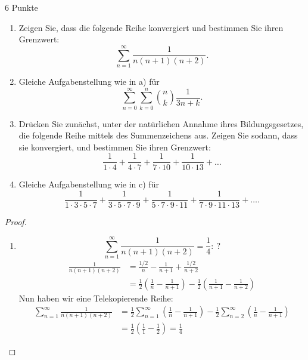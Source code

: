 \documentclass{../problemset}
\author{Michael van Straten}
\begin{document}
\maketitle

\begin{problem}{6 Punkte}
\begin{enumerate}
	\item Zeigen Sie, dass die folgende Reihe konvergiert und bestimmen Sie ihren Grenzwert:
	      \[
		      \sum_{n=1}^{\infty} \frac{1}{n(n + 1)(n + 2)}.
	      \]
	\item Gleiche Aufgabenstellung wie in a) für
	      \[
		      \sum_{n=0}^{\infty} \sum_{k=0}^{n} {n \choose k} \frac{1}{3n+k}.
	      \]
	\item Drücken Sie zunächst, unter der natürlichen Annahme ihres Bildungsgesetzes, die folgende Reihe mittels des Summenzeichens aus. Zeigen Sie sodann, dass sie konvergiert, und bestimmen Sie ihren Grenzwert:
	      \[
		      \frac{1}{1 \cdot 4 } + \frac{1}{4 \cdot 7 } + \frac{1}{7 \cdot 10} + \frac{1}{10 \cdot 13} + \ldots
	      \]
	\item Gleiche Aufgabenstellung wie in c) für
	      \[
		      \frac{1}{1 \cdot 3 \cdot 5 \cdot 7 } + \frac{1}{3 \cdot 5 \cdot 7 \cdot 9} + \frac{1}{5 \cdot 7 \cdot 9 \cdot 11} + \frac{1}{7 \cdot 9 \cdot 11 \cdot 13} + \ldots.
	      \]
\end{enumerate}
\begin{proof}
	\begin{enumerate}
		\item
		      \[
			      \sum_{n = 1}^{\infty}\frac{1}{n(n + 1)(n + 2)} = \frac{1}{4}:\ ?
		      \]
		      \begin{align}
			      \frac{1}{n(n + 1)(n + 2)} & = \frac{1/2}{n} - \frac{1}{n + 1} + \frac{1/2}{n + 2}                                                               \\
			                                & = \frac{1}{2}\left(\frac{1}{n} - \frac{1}{n + 1}\right) - \frac{1}{2}\left(\frac{1}{n + 1} - \frac{1}{n + 2}\right)
		      \end{align}
		      Nun haben wir eine Telekopierende Reihe:
		      \begin{align}
			      \sum_{n = 1}^{\infty}\frac{1}{n(n + 1)(n + 2)} & = \frac{1}{2}\sum_{n = 1}^{\infty}\left(\frac{1}{n} - \frac{1}{n + 1}\right) - \frac{1}{2}\sum_{n = 2}^{\infty}\left(\frac{1}{n} - \frac{1}{n + 1}\right) \\
			                                                     & = \frac{1}{2}\left(\frac{1}{1} - \frac{1}{2}\right) = \frac{1}{4}

\end{align}
\end{enumerate}
\end{proof}
\end{problem}
\end{document}
